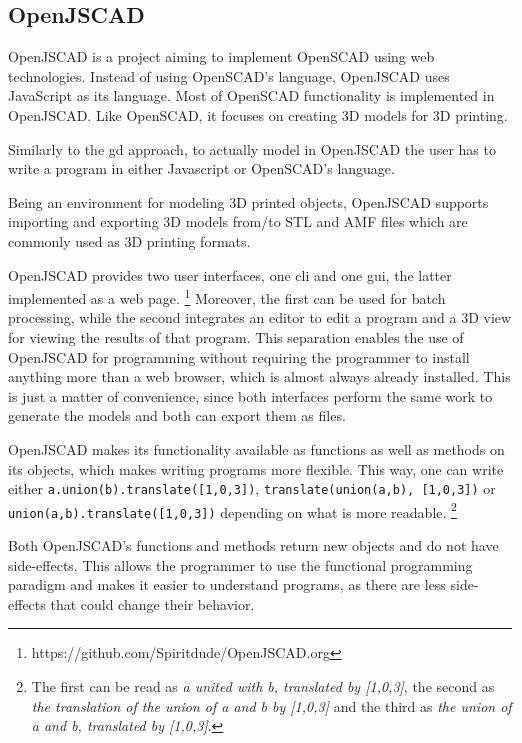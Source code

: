 \subsection{OpenJSCAD}
OpenJSCAD\cite{openjscad2015site} is a project aiming to implement OpenSCAD\cite{kintel2011openscad} using web technologies.
Instead of using OpenSCAD's language, OpenJSCAD uses JavaScript as its language.
Most of OpenSCAD functionality is implemented in OpenJSCAD.
Like OpenSCAD, it focuses on creating 3D models for 3D printing.

Similarly to the \gls{gd} approach, to actually model in OpenJSCAD the user has to write a program in either Javascript or OpenSCAD's language.

Being an environment for modeling 3D printed objects, OpenJSCAD supports importing and exporting 3D models from/to STL and AMF files which are commonly used as 3D printing formats.

OpenJSCAD provides two user interfaces, one \acrfull{cli} and one \acrfull{gui}, the latter implemented as a web page.%
\footnote{https://github.com/Spiritdude/OpenJSCAD.org}
Moreover, the first can be used for batch processing, while the second integrates an editor to edit a program and a 3D view for viewing the results of that program.
This separation enables the use of OpenJSCAD for programming without requiring the programmer to install anything more than a web browser, which is almost always already installed.
This is just a matter of convenience, since both interfaces perform the same work to generate the models and both can export them as files.

OpenJSCAD makes its functionality available as functions as well as methods on its objects, which makes writing programs more flexible.
This way, one can write either \texttt{a.union(b).translate([1,0,3])}, \texttt{translate(union(a,b), [1,0,3])} or \texttt{union(a,b).translate([1,0,3])} depending on what is more readable.%
\footnote{The first can be read as \emph{a united with b, translated by [1,0,3]}, the second as \emph{the translation of the union of a and b by [1,0,3]} and the third as \emph{the union of a and b, translated by [1,0,3]}.}

Both OpenJSCAD's functions and methods return new objects and do not have side-effects.
This allows the programmer to use the functional programming paradigm and makes it easier to understand programs, as there are less side-effects that could change their behavior.

